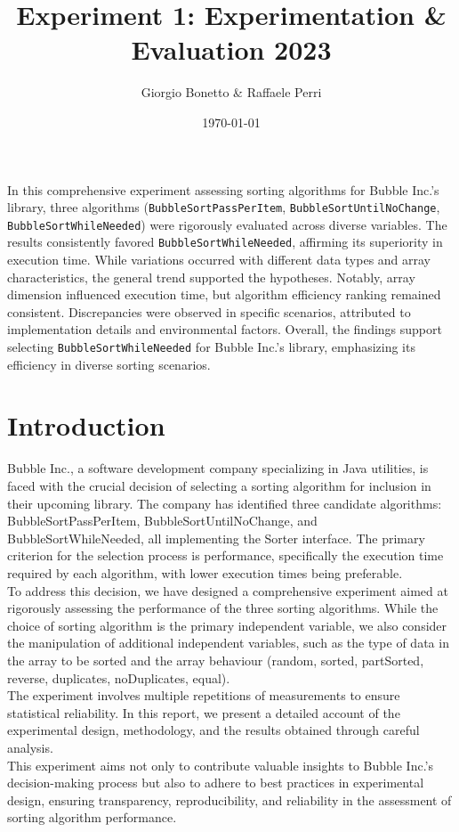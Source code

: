 \documentclass{article}
\title{Experiment 1: Experimentation \& Evaluation 2023}
\author{Giorgio Bonetto \& Raffaele Perri}
\date{\today}
\begin{document}
\maketitle
In this comprehensive experiment assessing sorting algorithms for Bubble Inc.'s library, three algorithms (\texttt{BubbleSortPassPerItem}, \texttt{BubbleSortUntilNoChange}, \texttt{BubbleSortWhileNeeded}) were rigorously evaluated across diverse variables. The results consistently favored \texttt{BubbleSortWhileNeeded}, affirming its superiority in execution time. While variations occurred with different data types and array characteristics, the general trend supported the hypotheses. Notably, array dimension influenced execution time, but algorithm efficiency ranking remained consistent. Discrepancies were observed in specific scenarios, attributed to implementation details and environmental factors. Overall, the findings support selecting \texttt{BubbleSortWhileNeeded} for Bubble Inc.'s library, emphasizing its efficiency in diverse sorting scenarios.

\section{Introduction}
Bubble Inc., a software development company specializing in Java utilities, is faced with the crucial decision of selecting a sorting algorithm for inclusion in their upcoming library. The company has identified three candidate algorithms: BubbleSortPassPerItem, BubbleSortUntilNoChange, and BubbleSortWhileNeeded, all implementing the Sorter interface. The primary criterion for the selection process is performance, specifically the execution time required by each algorithm, with lower execution times being preferable.\\
To address this decision, we have designed a comprehensive experiment aimed at rigorously assessing the performance of the three sorting algorithms. While the choice of sorting algorithm is the primary independent variable, we also consider the manipulation of additional independent variables, such as the type of data in the array to be sorted and the array behaviour (random, sorted, partSorted, reverse, duplicates, noDuplicates, equal).\\
The experiment involves multiple repetitions of measurements to ensure statistical reliability. In this report, we present a detailed account of the experimental design, methodology, and the results obtained through careful analysis.\\
This experiment aims not only to contribute valuable insights to Bubble Inc.'s decision-making process but also to adhere to best practices in experimental design, ensuring transparency, reproducibility, and reliability in the assessment of sorting algorithm performance.
\end{document}
